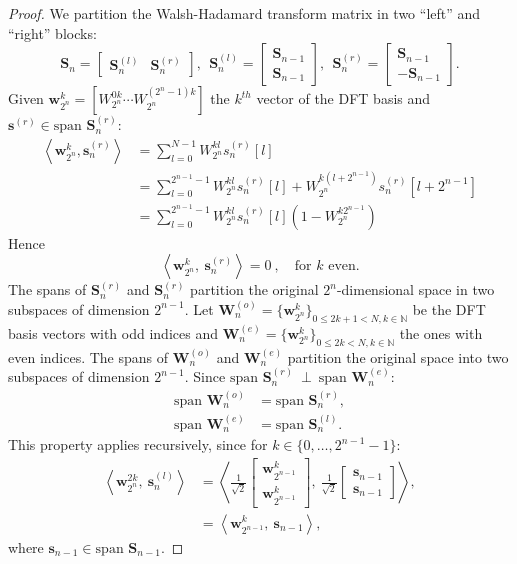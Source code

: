 \documentclass[journal,10pt]{IEEEtran}
\providecommand{\Nspace}{\mathbb{N}}
\providecommand{\mat}[1]{\boldsymbol{#1}}
\providecommand{\vct}[1]{\boldsymbol{#1}}
\begin{document}
\begin{proof}
We partition the Walsh-Hadamard transform matrix in two ``left'' and ``right'' blocks:
$$\mat S_n=\begin{bmatrix}\mat S_n^{(l)}& \mat S_n^{(r)}\end{bmatrix},\ \ \mat S_n^{(l)}=\begin{bmatrix}\mat S_{n-1}\\ \mat S_{n-1}\end{bmatrix},\ \ \mat S_n^{(r)}=\begin{bmatrix}\mat S_{n-1}\\ -\mat S_{n-1}\end{bmatrix}.$$
Given $\vct w_{2^n}^k=[W_{2^n}^{0k}\cdots W_{2^n}^{(2^n-1)k}]$ the $k^{th}$ vector of the DFT basis and $\vct s^{(r)}\in \text{span }{\mat S_n^{(r)}}$:
\begin{align*}
\left\langle\vct{w}_{2^n}^k,\vct{s}_n^{(r)}\right\rangle &= \sum_{l=0}^{N-1}W_{2^n}^{kl}s_n^{(r)}[l] \\
 &= \sum_{l=0}^{2^{n-1}-1}W_{2^n}^{kl}s_n^{(r)}[l]+W_{2^n}^{k(l+2^{n-1})}s_n^{(r)}[l+2^{n-1}]\\
 &= \sum_{l=0}^{2^{n-1}-1}W_{2^n}^{kl}s_n^{(r)}[l]\left(1-W_{2^n}^{k2^{n-1}}\right)
\end{align*}
Hence
$$\left\langle\vct{w}_{2^n}^k,\ \vct{s}_n^{(r)}\right\rangle=0\ ,\quad \text{for $k$ even.}$$
The spans of $\mat S_n^{(r)}$ and $\mat S_n^{(r)}$ partition the original $2^n$-dimensional space in two subspaces of  dimension $2^{n-1}$. Let $\mat W_n^{(o)}=\lbrace\vct w_{2^n}^k\rbrace_{0 \leq 2k+1<N,k\in\Nspace}$ be the DFT basis vectors with odd indices and $\mat W_n^{(e)}=\lbrace\vct w_{2^n}^k\rbrace_{0 \leq 2k<N,k\in\Nspace}$ the ones with even indices. The spans of $\mat W_n^{(o)}$ and $\mat W_n^{(e)}$ partition the original space into two subspaces of dimension $2^{n-1}$. Since $\text{span }\mat S_n^{(r)}\ \perp\ \text{span }\mat W_n^{(e)}$:
\begin{align*}\text{span }\mat W_n^{(o)} &= \text{span }\mat S_n^{(r)},\\
\text{span }\mat W_n^{(e)} &= \text{span }\mat S_n^{(l)}.
\end{align*}
This property applies recursively, since for $k\in\lbrace0,\dots, 2^{n-1}-1\rbrace$:
\begin{align*}\left\langle\vct{w}_{2^n}^{2k},\ \vct{s}_n^{(l)}\right\rangle &=\left\langle\frac{1}{\sqrt{2}}\begin{bmatrix}\vct{w}_{2^{n-1}}^k\\\vct{w}_{2^{n-1}}^k\end{bmatrix},\ \frac{1}{\sqrt{2}}\begin{bmatrix}\vct{s}_{n-1}\\\vct{s}_{n-1}\end{bmatrix}\right\rangle,\\
&=\left\langle\vct{w}_{2^{n-1}}^{k},\ \vct{s}_{n-1}\right\rangle,
\end{align*}
where $\vct s_{n-1}\in \text{span }{\mat S_{n-1}}$.
\end{proof}
\end{document}
